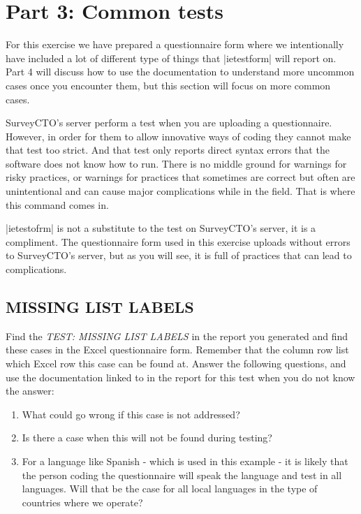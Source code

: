\documentclass{tufte-handout}
\begin{document}
\section{Part 3: Common tests}

	For this exercise we have prepared a questionnaire form where we intentionally have included a lot of different type of things that |ietestform| will report on. Part 4 will discuss how to use the documentation to understand more uncommon cases once you encounter them, but this section will focus on more common cases.
	
	SurveyCTO's server perform a test when you are uploading a questionnaire. However, in order for them to allow innovative ways of coding they cannot make that test too strict. And that test only reports direct syntax errors that the software does not know how to run. There is no middle ground for warnings for risky practices, or warnings for practices that sometimes are correct but often are unintentional and can cause major complications while in the field. That is where this command comes in. 
	
	|ietestofrm| is not a substitute to the test on SurveyCTO's server, it is a compliment. The questionnaire form used in this exercise uploads without errors to SurveyCTO's server, but as you will see, it is full of practices that can lead to complications.

\subsection{MISSING LIST LABELS}
	Find the \textit{TEST: MISSING LIST LABELS} in the report you generated and find these cases in the Excel questionnaire form. Remember that the column row list which Excel row this case can be found at. Answer the following questions, and use the documentation linked to in the report for this test when you do not know the answer:
	
	\begin{enumerate}
		\item What could go wrong if this case is not addressed?
		\item Is there a case when this will not be found during testing? 
		\item For a language like Spanish - which is used in this example - it is likely that the person coding the questionnaire will speak the language and test in all languages. Will that be the case for all local languages in the type of countries where we operate?
	\end{enumerate}
\end{document}
